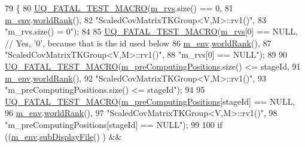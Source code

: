 \begin{DoxyCode}
79 \{
80   \hyperlink{_defines_8h_a56d63d18d0a6d45757de47fcc06f574d}{UQ\_FATAL\_TEST\_MACRO}(\hyperlink{class_q_u_e_s_o_1_1_base_t_k_group_a87c6b02ea45ab3de634c22afa58f53a5}{m\_rvs}.size() == 0,
81                       \hyperlink{class_q_u_e_s_o_1_1_base_t_k_group_a2bce5e8aa5c844d4332a0e73cf00a1f9}{m\_env}.\hyperlink{class_q_u_e_s_o_1_1_base_environment_a78b57112bbd0e6dd0e8afec00b40ffa7}{worldRank}(),
82                       \textcolor{stringliteral}{"ScaledCovMatrixTKGroup<V,M>::rv1()"},
83                       \textcolor{stringliteral}{"m\_rvs.size() = 0"});
84 
85   \hyperlink{_defines_8h_a56d63d18d0a6d45757de47fcc06f574d}{UQ\_FATAL\_TEST\_MACRO}(\hyperlink{class_q_u_e_s_o_1_1_base_t_k_group_a87c6b02ea45ab3de634c22afa58f53a5}{m\_rvs}[0] == NULL, \textcolor{comment}{// Yes, '0', because that is the id used
       below}
86                       \hyperlink{class_q_u_e_s_o_1_1_base_t_k_group_a2bce5e8aa5c844d4332a0e73cf00a1f9}{m\_env}.\hyperlink{class_q_u_e_s_o_1_1_base_environment_a78b57112bbd0e6dd0e8afec00b40ffa7}{worldRank}(),
87                       \textcolor{stringliteral}{"ScaledCovMatrixTKGroup<V,M>::rv1()"},
88                       \textcolor{stringliteral}{"m\_rvs[0] == NULL"});
89 
90   \hyperlink{_defines_8h_a56d63d18d0a6d45757de47fcc06f574d}{UQ\_FATAL\_TEST\_MACRO}(\hyperlink{class_q_u_e_s_o_1_1_base_t_k_group_a93d7fe55e30a7c6f209b01cb8a67e322}{m\_preComputingPositions}.size() <= stageId,
91                       \hyperlink{class_q_u_e_s_o_1_1_base_t_k_group_a2bce5e8aa5c844d4332a0e73cf00a1f9}{m\_env}.\hyperlink{class_q_u_e_s_o_1_1_base_environment_a78b57112bbd0e6dd0e8afec00b40ffa7}{worldRank}(),
92                       \textcolor{stringliteral}{"ScaledCovMatrixTKGroup<V,M>::rv1()"},
93                       \textcolor{stringliteral}{"m\_preComputingPositions.size() <= stageId"});
94 
95   \hyperlink{_defines_8h_a56d63d18d0a6d45757de47fcc06f574d}{UQ\_FATAL\_TEST\_MACRO}(\hyperlink{class_q_u_e_s_o_1_1_base_t_k_group_a93d7fe55e30a7c6f209b01cb8a67e322}{m\_preComputingPositions}[stageId] == NULL,
96                       \hyperlink{class_q_u_e_s_o_1_1_base_t_k_group_a2bce5e8aa5c844d4332a0e73cf00a1f9}{m\_env}.\hyperlink{class_q_u_e_s_o_1_1_base_environment_a78b57112bbd0e6dd0e8afec00b40ffa7}{worldRank}(),
97                       \textcolor{stringliteral}{"ScaledCovMatrixTKGroup<V,M>::rv1()"},
98                       \textcolor{stringliteral}{"m\_preComputingPositions[stageId] == NULL"});
99 
100   \textcolor{keywordflow}{if} ((\hyperlink{class_q_u_e_s_o_1_1_base_t_k_group_a2bce5e8aa5c844d4332a0e73cf00a1f9}{m\_env}.\hyperlink{class_q_u_e_s_o_1_1_base_environment_a8a0064746ae8dddfece4229b9ad374d6}{subDisplayFile}()        ) &&

\end{DoxyCode}
